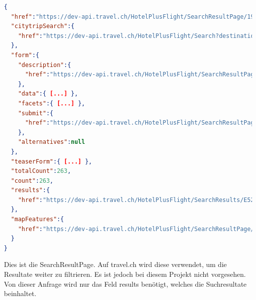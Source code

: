 \begin{lstlisting}[language=json,firstnumber=1]
{
  "href":"https://dev-api.travel.ch/HotelPlusFlight/SearchResultPage/19E2B6BB-1F06-4396-B86E-169EDB368B0E?sortMethod.type=https%3A%2F%2Fdev-api.travel.ch%2FSortType%2FPrice&ratings.minimal=0[...]",
  "citytripSearch":{
    "href":"https://dev-api.travel.ch/HotelPlusFlight/Search?destination=https%3A%2F%2Fdev-api.travel.ch%2FDestination%2F6547539&periodOfStay.checkInDate=2016-10-05&periodOfStay.checkOutDate=2016-10-08[...]"
  },
  "form":{
    "description":{
      "href":"https://dev-api.travel.ch/HotelPlusFlight/SearchResultPageFormDescription/19E2B6BB-1F06-4396-B86E-169EDB368B0E?searchResultPageId=E5241069-1272-4DD0-946E-46DD2E9D55E6"
    },
    "data":{ [...] },
    "facets":{ [...] },
    "submit":{
      "href":"https://dev-api.travel.ch/HotelPlusFlight/SearchResultPage/19E2B6BB-1F06-4396-B86E-169EDB368B0E{?paging.offset,paging.size,[...],luggageOptions*}"
    },
    "alternatives":null
  },
  "teaserForm":{ [...] },
  "totalCount":263,
  "count":263,
  "results":{
    "href":"https://dev-api.travel.ch/HotelPlusFlight/SearchResults/E5241069-1272-4DD0-946E-46DD2E9D55E6"
  },
  "mapFeatures":{
    "href":"https://dev-api.travel.ch/HotelPlusFlight/SearchResultPage/E5241069-1272-4DD0-946E-46DD2E9D55E6/Map"
  }
}
\end{lstlisting}
Dies ist die SearchResultPage. Auf travel.ch wird diese verwendet, um die Resultate weiter zu filtrieren. Es ist jedoch bei diesem Projekt nicht vorgesehen. Von dieser Anfrage wird nur das Feld results benötigt, welches die Suchresultate beinhaltet.

